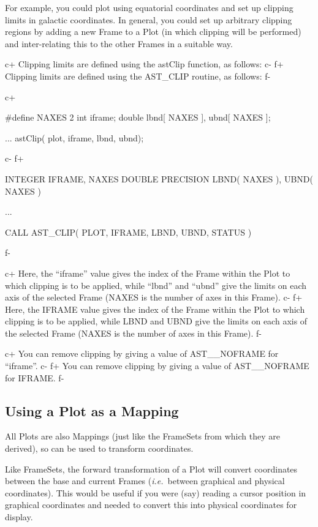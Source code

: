 \documentclass[twoside,11pt]{starlink}
\begin{document}
For example, you could plot using equatorial coordinates and set up
clipping limits in galactic coordinates. In general, you could set up
arbitrary clipping regions by adding a new Frame to a Plot (in which
clipping will be performed) and inter-relating this to the other
Frames in a suitable way.

c+
Clipping limits are defined using the astClip function, as follows:
c-
f+
Clipping limits are defined using the AST\_CLIP routine, as follows:
f-

c+
\small
\begin{terminalv}
#define NAXES 2
int iframe;
double lbnd[ NAXES ], ubnd[ NAXES ];

...
astClip( plot, iframe, lbnd, ubnd);
\end{terminalv}
\normalsize
c-
f+
\small
\begin{terminalv}
      INTEGER IFRAME, NAXES
      DOUBLE PRECISION LBND( NAXES ), UBND( NAXES )

      ...

      CALL AST_CLIP( PLOT, IFRAME, LBND, UBND, STATUS )
\end{terminalv}
\normalsize
f-

c+
Here, the ``iframe'' value gives the index of the Frame within the
Plot to which clipping is to be applied, while ``lbnd'' and ``ubnd''
give the limits on each axis of the selected Frame (NAXES is the
number of axes in this Frame).
c-
f+
Here, the IFRAME value gives the index of the Frame within the Plot to
which clipping is to be applied, while LBND and UBND give the limits
on each axis of the selected Frame (NAXES is the number of axes in
this Frame).
f-

c+
You can remove clipping by giving a value of AST\_\_NOFRAME for ``iframe''.
c-
f+
You can remove clipping by giving a value of AST\_\_NOFRAME for IFRAME.
f-

\subsection{Using a Plot as a Mapping}

All Plots are also Mappings (just like the FrameSets from which they
are derived), so can be used to transform coordinates.

Like FrameSets, the forward transformation of a Plot will convert
coordinates between the base and current Frames (\emph{i.e.}\ between
graphical and physical coordinates). This would be useful if you were
(say) reading a cursor position in graphical coordinates and needed to
convert this into physical coordinates for display.
\end{document}
